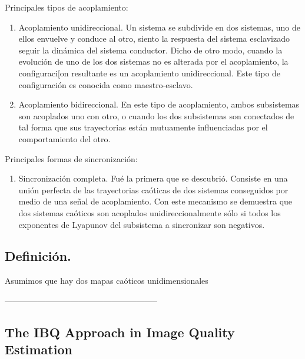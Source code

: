 \documentclass[prodmode,acmtap]{acmlarge}
\begin{document}
Principales tipos de acoplamiento:
\begin{enumerate}
\item Acoplamiento unidireccional.
Un sistema se subdivide en dos sistemas, uno de ellos envuelve y conduce al otro, siento la respuesta del sistema esclavizado seguir la dinámica del sistema conductor. 
Dicho de otro modo, cuando la evolución de uno de los dos sistemas no es alterada por el acoplamiento, la configuraci[on resultante es un acoplamiento unidireccional. Este tipo de configuración es conocida como maestro-esclavo.
\item Acoplamiento bidireccional. En este tipo de acoplamiento, ambos subsistemas son acoplados uno con otro, o cuando los dos subsistemas son conectados de tal forma que sus trayectorias están mutuamente influenciadas por el comportamiento del otro. 
\end{enumerate}

Principales formas de sincronización:
\begin{enumerate}
\item Sincronización completa. Fué la primera que se descubrió. Consiste en una unión perfecta de las trayectorias caóticas de dos sistemas conseguidos por medio de una señal de acoplamiento. Con este mecanismo se demuestra que dos sistemas caóticos son acoplados unidireccionalmente sólo si todos los exponentes de Lyapunov del subsistema a sincronizar son negativos.
\end{enumerate}


\subsection{Definición.}
Asumimos que hay dos mapas caóticos unidimensionales 



--------------------------------------------------------

\subsection{The IBQ Approach in Image Quality Estimation}
\end{document}
